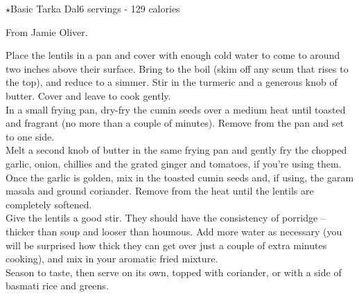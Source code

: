 \begin{recipe}{\texorpdfstring{$\star$}{str}Basic Tarka Dal}{6 servings - 129 calories}{}

\freeform From Jamie Oliver.


Place the lentils in a pan and cover with enough cold water to come to around two inches above their surface. Bring to the boil (skim off any scum that rises to the top), and reduce to a simmer. Stir in the turmeric and a generous knob of butter. Cover and leave to cook gently.\\

In a small frying pan, dry-fry the cumin seeds over a medium heat until toasted and fragrant (no more than a couple of minutes). Remove from the pan and set to one side.\\

Melt a second knob of butter in the same frying pan and gently fry the chopped garlic, onion, chillies and the grated ginger and tomatoes, if you’re using them. Once the garlic is golden, mix in the toasted cumin seeds and, if using, the garam masala and ground coriander. Remove from the heat until the lentils are completely softened.\\

Give the lentils a good stir. They should have the consistency of porridge – thicker than soup and looser than houmous. Add more water as necessary (you will be surprised how thick they can get over just a couple of extra minutes cooking), and mix in your aromatic fried mixture.\\

Season to taste, then serve on its own, topped with coriander, or with a side of basmati rice and greens.

\end{recipe}